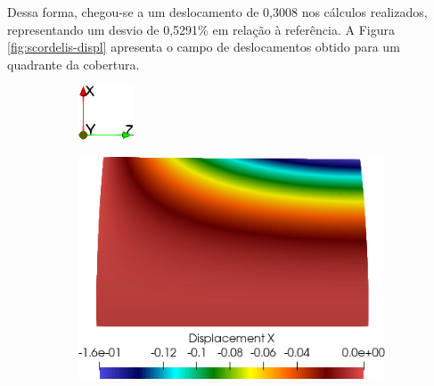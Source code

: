 Dessa forma, chegou-se a um deslocamento de 0,3008 nos cálculos realizados, representando um desvio de 0,5291\% em relação à referência. A Figura \ref{fig:scordelis-displ} apresenta o campo de deslocamentos obtido para um quadrante da cobertura.

\begin{figure}[h!]
    \centering
    \caption{Campos de deslocamentos obtido na simulação de \textit{Scordelis-Lo roof}.}
    \begin{subfigure}{0.05\textwidth}
        \includegraphics[width=\linewidth]{Figuras/scordelis/eixos.png}
    \end{subfigure}
    \begin{subfigure}{0.31\textwidth}
        \includegraphics[width=\linewidth]{Figuras/scordelis/ux.png}

\end{subfigure}
\end{figure}
